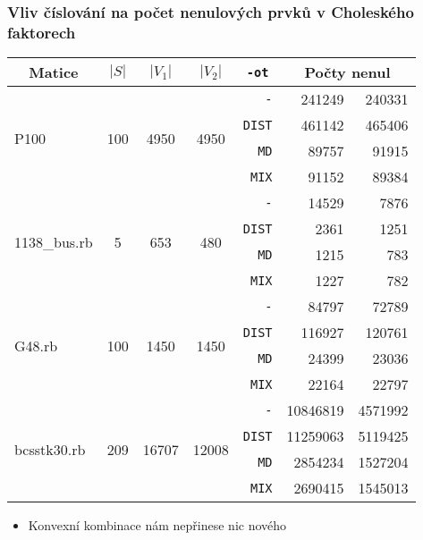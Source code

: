 \documentclass{beamer}
\begin{document}
\begin{frame}
    \frametitle{Vliv číslování na počet nenulových prvků v Choleského faktorech}

    \begin{table}[ht]
      \tiny
      \centering
      \renewcommand{\arraystretch}{1.15}
    \begin{tabular}{|l|c|c|c|r|r|r|}
      \hline
      \multicolumn{1}{|c|}{Matice} & \multicolumn{1}{|c|}{$|S|$}    &\multicolumn{1}{|c|}{$|V_1|$} &\multicolumn{1}{|c|}{$|V_2|$} & \multicolumn{1}{|c|}{\texttt{-ot}} & \multicolumn{2}{c|}{Počty nenul} \\
      \hline
      \multirow{4}{*}{P100}
      &	\multirow{4}{*}{100}	&	\multirow{4}{*}{4950}	&	\multirow{4}{*}{4950}	&\texttt{-}&	241249	&	240331	\\
      &	&	&	&\texttt{DIST}&	461142	&	465406	\\
      &	&	&	&\texttt{MD}&	89757	&	91915	\\
      &	&	&	&\texttt{MIX}&	91152	&	89384	\\
      \hline
      \multirow{4}{*}{1138\_bus.rb}
      &	\multirow{4}{*}{5}	&	\multirow{4}{*}{653}	&	\multirow{4}{*}{480}	&\texttt{-}    &	14529	&	7876	\\
      & & & &\texttt{DIST} &	2361	&	1251	\\
      & & & &\texttt{MD}   &	1215	&	783	\\
      & & & &\texttt{MIX}  &	1227	&	782	\\
      \hline
      \multirow{4}{*}{G48.rb}
      &	\multirow{4}{*}{100}	&	\multirow{4}{*}{1450}	&	\multirow{4}{*}{1450}	&\texttt{-}    &	84797	&	72789	\\
      & & & &\texttt{DIST} &	116927	&	120761	\\
      & & & &\texttt{MD}   &	24399	&	23036	\\
      & & & &\texttt{MIX}  &	22164	&	22797	\\
      \hline
      \multirow{4}{*}{bcsstk30.rb	}
      &	\multirow{4}{*}{209}	&	\multirow{4}{*}{16707}	&	\multirow{4}{*}{12008}	&\texttt{-}    &	10846819	&	4571992	\\
      & & & &\texttt{DIST} 	&	11259063	&	5119425	\\
      & & & &\texttt{MD}		& 2854234   & 1527204	\\
      & & & &\texttt{MIX}		&	2690415		& 1545013 \\
      \hline
    \end{tabular}
    \end{table}
    \begin{itemize}
      \item Konvexní kombinace nám nepřinese nic nového
    \end{itemize}
\end{frame}
\end{document}

